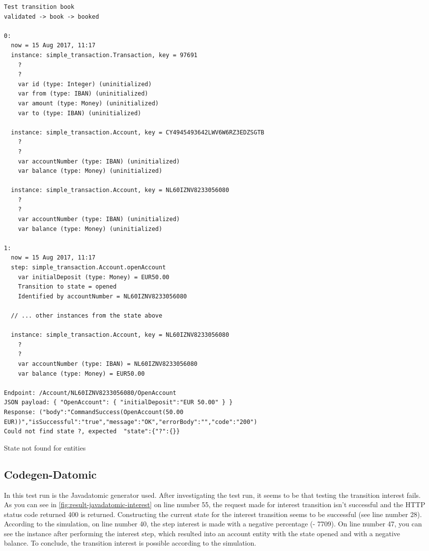 \begin{sourcecode}[h!]
\begin{lstlisting}[]
Test transition book
validated -> book -> booked

0:
  now = 15 Aug 2017, 11:17
  instance: simple_transaction.Transaction, key = 97691
    ?
    ?
    var id (type: Integer) (uninitialized)
    var from (type: IBAN) (uninitialized)
    var amount (type: Money) (uninitialized)
    var to (type: IBAN) (uninitialized)

  instance: simple_transaction.Account, key = CY4945493642LWV6W6RZ3EDZSGTB
    ?
    ?
    var accountNumber (type: IBAN) (uninitialized)
    var balance (type: Money) (uninitialized)

  instance: simple_transaction.Account, key = NL60IZNV8233056080
    ?
    ?
    var accountNumber (type: IBAN) (uninitialized)
    var balance (type: Money) (uninitialized)

1:
  now = 15 Aug 2017, 11:17
  step: simple_transaction.Account.openAccount
    var initialDeposit (type: Money) = EUR50.00
    Transition to state = opened
    Identified by accountNumber = NL60IZNV8233056080

  // ... other instances from the state above

  instance: simple_transaction.Account, key = NL60IZNV8233056080
    ?
    ?
    var accountNumber (type: IBAN) = NL60IZNV8233056080
    var balance (type: Money) = EUR50.00

Endpoint: /Account/NL60IZNV8233056080/OpenAccount
JSON payload: { "OpenAccount": { "initialDeposit":"EUR 50.00" } }
Response: ("body":"CommandSuccess(OpenAccount(50.00 EUR))","isSuccessful":"true","message":"OK","errorBody":"","code":"200")
Could not find state ?, expected  "state":{"?":{}}
\end{lstlisting}
\caption{State not found for entities}\label{fig:result-not-found-state}
\end{sourcecode}
\FloatBarrier

\subsection{Codegen-Datomic}\label{sec:bug-interest-javadatomic}

In this test run is the Javadatomic generator used. After investigating the test
run, it seems to be that testing the transition interest fails. As you can see
in \autoref{fig:result-javadatomic-interest} on line number 55, the request made
for interest transition isn't successful and the HTTP status code returned 400
is returned. Constructing the current state for the interest transition seems to
be successful (see line number 28). According to the simulation, on line number
40, the step interest is made with a negative percentage (- 7709). On line
number 47, you can see the instance after performing the interest step, which
resulted into an account entity with the state opened and with a negative
balance. To conclude, the transition interest is possible according to the
simulation.

